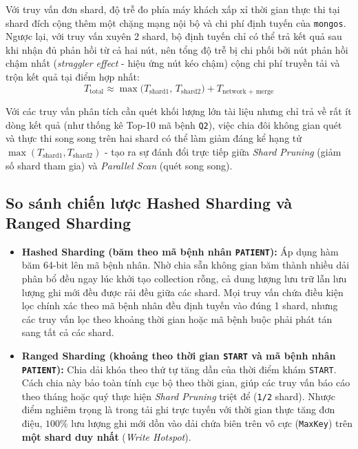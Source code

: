 Với truy vấn đơn shard, độ trễ đo phía máy khách xấp xỉ thời gian thực thi tại shard đích cộng thêm một chặng mạng nội bộ và chi phí định tuyến của \texttt{mongos}. Ngược lại, với truy vấn xuyên 2 shard, bộ định tuyến chỉ có thể trả kết quả sau khi nhận đủ phản hồi từ cả hai nút, nên tổng độ trễ bị chi phối bởi nút phản hồi chậm nhất (\textit{straggler effect} - hiệu ứng nút kéo chậm) cộng chi phí truyền tải và trộn kết quả tại điểm hợp nhất:
\begin{equation}
T_{\text{total}} \approx \max\big(T_{\text{shard1}},\, T_{\text{shard2}}\big) + T_{\text{network + merge}}
\label{eq:cross-shard-latency}
\end{equation}

Với các truy vấn phân tích cần quét khối lượng lớn tài liệu nhưng chỉ trả về rất ít dòng kết quả (như thống kê Top-10 mã bệnh \texttt{Q2}), việc chia đôi không gian quét và thực thi song song trên hai shard có thể làm giảm đáng kể hạng tử $\max(T_{\text{shard1}}, T_{\text{shard2}})$ - tạo ra sự đánh đổi trực tiếp giữa \textit{Shard Pruning} (giảm số shard tham gia) và \textit{Parallel Scan} (quét song song).

\subsection{So sánh chiến lược Hashed Sharding và Ranged Sharding}

\begin{itemize}[leftmargin=0.8cm, itemsep=4pt]
  \item \textbf{Hashed Sharding (băm theo mã bệnh nhân \texttt{PATIENT}):} Áp dụng hàm băm 64-bit lên mã bệnh nhân. Nhờ chia sẵn không gian băm thành nhiều dải phân bổ đều ngay lúc khởi tạo collection rỗng, cả dung lượng lưu trữ lẫn lưu lượng ghi mới đều được rải đều giữa các shard. Mọi truy vấn chứa điều kiện lọc chính xác theo mã bệnh nhân đều định tuyến vào đúng 1 shard, nhưng các truy vấn lọc theo khoảng thời gian hoặc mã bệnh buộc phải phát tán sang tất cả các shard.
  \item \textbf{Ranged Sharding (khoảng theo thời gian \texttt{START} và mã bệnh nhân \texttt{PATIENT}):} Chia dải khóa theo thứ tự tăng dần của thời điểm khám \texttt{START}. Cách chia này bảo toàn tính cục bộ theo thời gian, giúp các truy vấn báo cáo theo tháng hoặc quý thực hiện \textit{Shard Pruning} triệt để (\texttt{1/2} shard). Nhược điểm nghiêm trọng là trong tải ghi trực tuyến với thời gian thực tăng đơn điệu, $100\%$ lưu lượng ghi mới dồn vào dải chứa biên trên vô cực (\texttt{MaxKey}) trên \textbf{một shard duy nhất} (\textit{Write Hotspot}).
\end{itemize}

